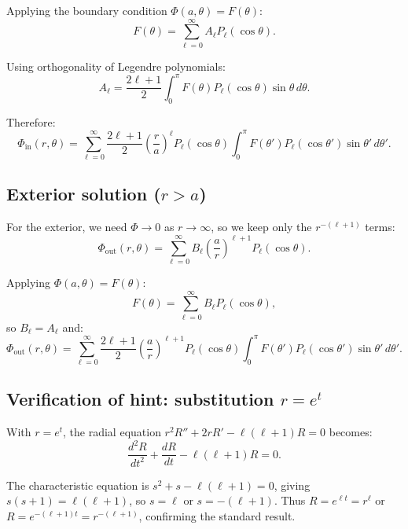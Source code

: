 \documentclass[12pt]{article}
\begin{document}
Applying the boundary condition $\Phi(a,\theta) = F(\theta)$:
\[
F(\theta) = \sum_{\ell=0}^{\infty} A_\ell P_\ell(\cos\theta).
\]

Using orthogonality of Legendre polynomials:
\[
A_\ell = \frac{2\ell+1}{2}\int_0^{\pi} F(\theta) P_\ell(\cos\theta)\sin\theta\,d\theta.
\]

Therefore:
\[
\boxed{\Phi_{\text{in}}(r,\theta) = \sum_{\ell=0}^{\infty} \frac{2\ell+1}{2}\left(\frac{r}{a}\right)^\ell P_\ell(\cos\theta) \int_0^{\pi} F(\theta') P_\ell(\cos\theta')\sin\theta'\,d\theta'.}
\]

\subsection*{Exterior solution ($r > a$)}

For the exterior, we need $\Phi \to 0$ as $r \to \infty$, so we keep only the $r^{-(\ell+1)}$ terms:
\[
\Phi_{\text{out}}(r,\theta) = \sum_{\ell=0}^{\infty} B_\ell \left(\frac{a}{r}\right)^{\ell+1} P_\ell(\cos\theta).
\]

Applying $\Phi(a,\theta) = F(\theta)$:
\[
F(\theta) = \sum_{\ell=0}^{\infty} B_\ell P_\ell(\cos\theta),
\]
so $B_\ell = A_\ell$ and:
\[
\boxed{\Phi_{\text{out}}(r,\theta) = \sum_{\ell=0}^{\infty} \frac{2\ell+1}{2}\left(\frac{a}{r}\right)^{\ell+1} P_\ell(\cos\theta) \int_0^{\pi} F(\theta') P_\ell(\cos\theta')\sin\theta'\,d\theta'.}
\]

\subsection*{Verification of hint: substitution $r = e^t$}

With $r = e^t$, the radial equation $r^2 R'' + 2r R' - \ell(\ell+1)R = 0$ becomes:
\[
\frac{d^2R}{dt^2} + \frac{dR}{dt} - \ell(\ell+1)R = 0.
\]

The characteristic equation is $s^2 + s - \ell(\ell+1) = 0$, giving $s(s+1) = \ell(\ell+1)$, so $s = \ell$ or $s = -(\ell+1)$. Thus $R = e^{\ell t} = r^\ell$ or $R = e^{-(\ell+1)t} = r^{-(\ell+1)}$, confirming the standard result.
\end{document}
